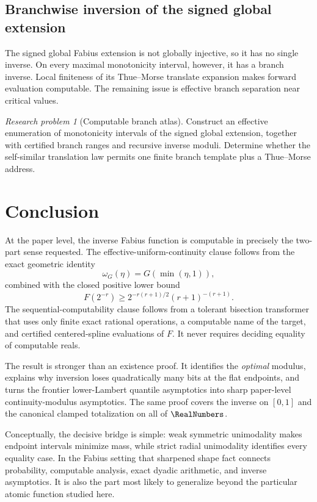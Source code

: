\documentclass[11pt,oneside]{article}
\theoremstyle{definition}
\theoremstyle{remark}
\numberwithin{equation}{section}
\newtheorem{problem}[theorem]{Research problem}
\begin{document}
\subsection{Branchwise inversion of the signed global extension}

The signed global Fabius extension is not globally injective, so it has no
single inverse.  On every maximal monotonicity interval, however, it has a
branch inverse.  Local finiteness of its Thue--Morse translate expansion makes
forward evaluation computable.  The remaining issue is effective branch
separation near critical values.

\begin{problem}[Computable branch atlas]
Construct an effective enumeration of monotonicity intervals of the signed
global extension, together with certified branch ranges and recursive inverse
moduli.  Determine whether the self-similar translation law permits one finite
branch template plus a Thue--Morse address.
\end{problem}

\section{Conclusion}
\label{sec:conclusion}

At the paper level, the inverse Fabius function is computable in precisely the
two-part sense requested.  The effective-uniform-continuity clause follows
from the exact
geometric identity
\[
  \omega_G(\eta)=G(\min(\eta,1)),
\]
combined with the closed positive lower bound
\[
 F(2^{-r})\ge
 2^{-r(r+1)/2}(r+1)^{-(r+1)}.
\]
The sequential-computability clause follows from a tolerant bisection
transformer that uses only finite exact rational operations, a computable name
of the target, and certified centered-spline evaluations of $F$.  It never
requires deciding equality of computable reals.

The result is stronger than an existence proof.  It identifies the
\emph{optimal} modulus, explains why inversion loses quadratically many bits
at the flat endpoints, and turns the frontier lower-Lambert quantile
asymptotics into sharp paper-level continuity-modulus asymptotics.  The same proof covers
the inverse on $[0,1]$ and the canonical clamped totalization on all of
$\RealNumbers$.

Conceptually, the decisive bridge is simple: weak symmetric unimodality makes
endpoint intervals minimize mass, while strict radial unimodality identifies
every equality case.  In the Fabius setting that sharpened shape fact connects
probability, computable analysis, exact dyadic arithmetic, and inverse
asymptotics.  It is also the part most likely to generalize beyond the
particular atomic function studied here.
\end{document}
